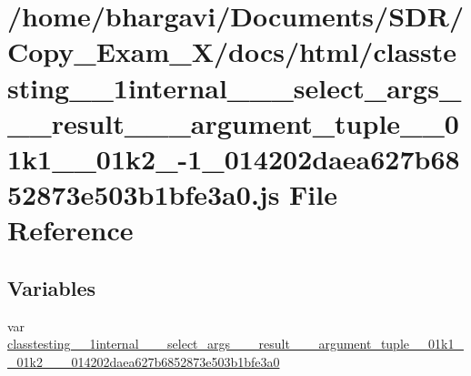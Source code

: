 \hypertarget{classtesting__1__1internal__1__1__select__args__3__01__result__00__01__argument__tuple__00__01k120dbb86fb1f0fc1f0da5adc6f1902f40}{}\section{/home/bhargavi/\+Documents/\+S\+D\+R/\+Copy\+\_\+\+Exam\+\_\+X/docs/html/classtesting\+\_\+\_\+1internal\+\_\+\_\+\_\+select\+\_\+args\+\_\+\_\+\_\+result\+\_\+\_\+\_\+argument\+\_\+tuple\+\_\+\_\+01k1\+\_\+\_\+01k2\+\_-\/1\+\_\+014202daea627b6852873e503b1bfe3a0.js File Reference}
\label{classtesting__1__1internal__1__1__select__args__3__01__result__00__01__argument__tuple__00__01k120dbb86fb1f0fc1f0da5adc6f1902f40}
\subsection*{Variables}
\begin{DoxyCompactItemize}
\item 
var \hyperlink{classtesting__1__1internal__1__1__select__args__3__01__result__00__01__argument__tuple__00__01k120dbb86fb1f0fc1f0da5adc6f1902f40_a9e12188e24e40bb37e3a3807f79715b9}{classtesting\+\_\+\_\+1internal\+\_\+\_\+\_\+select\+\_\+args\+\_\+\_\+\_\+result\+\_\+\_\+\_\+argument\+\_\+tuple\+\_\+\_\+01k1\+\_\+\_\+01k2\+\_\+\_\+\_\+014202daea627b6852873e503b1bfe3a0}
\end{DoxyCompactItemize}


